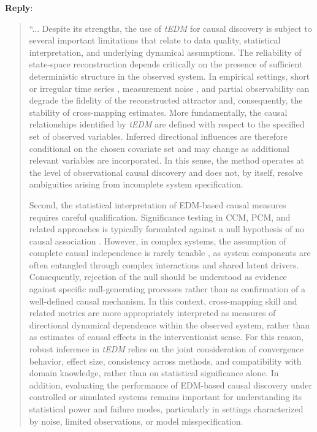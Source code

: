 \documentclass[11pt]{article}
\newenvironment{reply}
   {\medskip \noindent \color{blue} \begin{sf}\textbf{Reply}:\  }
   {\medskip \par \end{sf}}
\begin{document}
\begin{reply}
\begingroup
\color{red}\itshape
\begin{quote}
    ``... Despite its strengths, the use of \textit{tEDM} for causal discovery is subject to several important limitations that relate to data quality, statistical interpretation, and underlying dynamical assumptions. The reliability of state-space reconstruction depends critically on the presence of sufficient deterministic structure in the observed system. In empirical settings, short or irregular time series \citep{ma2014cms,clark2015multispatialccm}, measurement noise \citep{mnster2017ccm_performance}, and partial observability can degrade the fidelity of the reconstructed attractor and, consequently, the stability of cross-mapping estimates. More fundamentally, the causal relationships identified by \textit{tEDM} are defined with respect to the specified set of observed variables. Inferred directional influences are therefore conditional on the chosen covariate set and may change as additional relevant variables are incorporated. In this sense, the method operates at the level of observational causal discovery and does not, by itself, resolve ambiguities arising from incomplete system specification.
    
    Second, the statistical interpretation of EDM-based causal measures requires careful qualification. Significance testing in CCM, PCM, and related approaches is typically formulated against a null hypothesis of no causal association \citep{tao2023cmc}. However, in complex systems, the assumption of complete causal independence is rarely tenable \citep{meehl1990all_cor_vars}, as system components are often entangled through complex interactions and shared latent drivers. Consequently, rejection of the null should be understood as evidence against specific null-generating processes rather than as confirmation of a well-defined causal mechanism. In this context, cross-mapping skill and related metrics are more appropriately interpreted as measures of directional dynamical dependence within the observed system, rather than as estimates of causal effects in the interventionist sense. For this reason, robust inference in \textit{tEDM} relies on the joint consideration of convergence behavior, effect size, consistency across methods, and compatibility with domain knowledge, rather than on statistical significance alone. In addition, evaluating the performance of EDM-based causal discovery under controlled or simulated systems remains important for understanding its statistical power and failure modes, particularly in settings characterized by noise, limited observations, or model misspecification.
    

\end{quote}
\end{reply}
\end{document}

